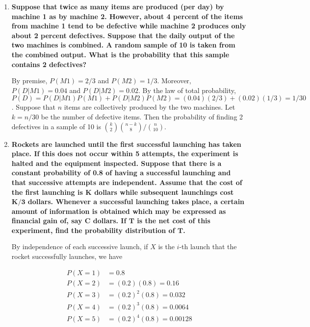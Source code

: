 \documentclass[10pt, oneside]{article}   	%
\theoremstyle{definition}
\begin{document}
\begin{enumerate}[label=4.\arabic*]
\item  \begin{tcolorbox}[
  colback=Cerulean!5!white,
  colframe=Cerulean!75!black]
\textbf{Suppose that twice as many items are produced (per day) by machine 1 as by machine 2. However, about 4 percent of the items from machine 1 tend to be defective while machine 2 produces only about 2 percent defectives. Suppose that the daily output of the two machines is combined. A random sample of 10 is taken from the combined output. What is the probability that this sample contains 2 defectives?}
\end{tcolorbox}

By premise, $P(M1) = 2/3$ and $P(M2) = 1/3$. Moreover, $P(D | M1) = 0.04$ and $P(D | M2) = 0.02$. By the law of total probability, $P(D) = P(D | M1) P(M1) + P(D | M2) P(M2) = (0.04)(2/3) + (0.02)(1/3) = 1/30$. Suppose that $n$ items are collectively produced by the two machines. Let $k = n/30$ be the number of defective items. Then the probability of finding 2 defectives in a sample of 10 is $\boxed{ \binom{k}{2} \binom{n-k}{8} / \binom{n}{10} }$.

\item  \begin{tcolorbox}[
  colback=Cerulean!5!white,
  colframe=Cerulean!75!black]
\textbf{Rockets are launched until the first successful launching has taken place. If this does not occur within 5 attempts, the experiment is halted and the equipment inspected. Suppose that there is a constant probability of 0.8 of having a successful launching and that successive attempts are independent. Assume that the cost of the first launching is $\bm{K}$ dollars while subsequent launchings cost $\bm{K/3}$ dollars. Whenever a successful launching takes place, a certain amount of information is obtained which may be expressed as financial gain of, say $\bm{C}$ dollars. If $\bm{T}$ is the net cost of this experiment, find the probability distribution of $\bm{T}$.}
\end{tcolorbox}

By independence of each successive launch, if $X$ is the $i$-th launch that the rocket successfully launches, we have

\begin{align*}
P(X = 1) &= 0.8 \\
P(X = 2) &= (0.2)(0.8) = 0.16 \\
P(X = 3) &= (0.2)^2 (0.8) = 0.032 \\
P(X = 4) &= (0.2)^3 (0.8) = 0.0064 \\
P(X = 5) &= (0.2)^4 (0.8) = 0.00128
\end{align*}


\end{enumerate}
\end{document}
